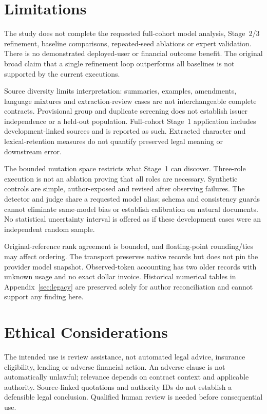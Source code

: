 \documentclass[11pt]{article}
\begin{document}
\clearpage
\section*{Limitations}
The study does not complete the requested full-cohort model analysis,
Stage~2/3 refinement, baseline comparisons, repeated-seed ablations or
expert validation. There is no demonstrated deployed-user or financial
outcome benefit. The original broad claim that a single refinement loop
outperforms all baselines is not supported by the current executions.

Source diversity limits interpretation: summaries, examples, amendments,
language mixtures and extraction-review cases are not interchangeable
complete contracts. Provisional group and duplicate screening does not
establish issuer independence or a held-out population. Full-cohort
Stage~1 application includes development-linked sources and is reported
as such. Extracted character and lexical-retention measures do not
quantify preserved legal meaning or downstream error.

The bounded mutation space restricts what Stage~1 can discover. Three-role
execution is not an ablation proving that all roles are necessary.
Synthetic controls are simple, author-exposed and revised after observing
failures. The detector and judge share a requested model alias; schema and
consistency guards cannot eliminate same-model bias or establish
calibration on natural documents. No statistical uncertainty interval is
offered as if these development cases were an independent random sample.

Original-reference rank agreement is bounded, and floating-point
rounding/ties may affect ordering. The transport preserves native records
but does not pin the provider model snapshot. Observed-token accounting
has two older records with unknown usage and no exact dollar invoice.
Historical numerical tables in Appendix~\ref{sec:legacy} are preserved
solely for author reconciliation and cannot support any finding here.

\section*{Ethical Considerations}
The intended use is review assistance, not automated legal advice,
insurance eligibility, lending or adverse financial action. An adverse
clause is not automatically unlawful; relevance depends on contract
context and applicable authority. Source-linked quotations and authority
IDs do not establish a defensible legal conclusion. Qualified human
review is needed before consequential use.
\end{document}
